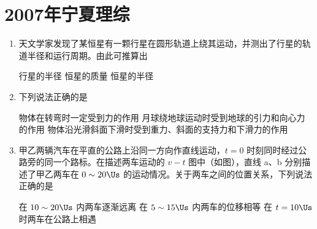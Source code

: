 \documentclass[\gkver]{gaokaozhenti}
\begin{document}
\chapter{2007年宁夏理综}

\begin{enumerate}
\item
天文学家发现了某恒星有一颗行星在圆形轨道上绕其运动，并测出了行星的轨道半径和运行周期。由此可推算出

{行星的半径}
{恒星的质量}
{恒星的半径}


\item
下列说法正确的是

{物体在转弯时一定受到力的作用}
{月球绕地球运动时受到地球的引力和向心力的作用}
{物体沿光滑斜面下滑时受到重力、斜面的支持力和下滑力的作用}


\item
甲乙两辆汽车在平直的公路上沿同一方向作直线运动，$t=0$ 时刻同时经过公路旁的同一个路标。在描述两车运动的 $v-t$ 图中（如图），直线 a、b 分别描述了甲乙两车在 $0\sim20\Us$ 的运动情况。关于两车之间的位置关系，下列说法正确的是


{在 $10\sim20\Us$ 内两车逐渐远离}
{在 $5\sim15\Us$ 内两车的位移相等}
{在 $t=10\Us$ 时两车在公路上相遇}



\end{enumerate}
\end{document}
